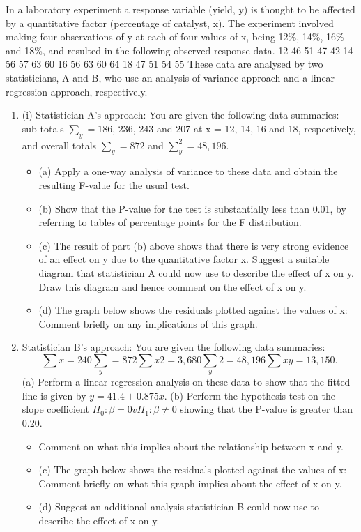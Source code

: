 \documentclass[a4paper,12pt]{article}
\begin{document}

In a laboratory experiment a response variable (yield, y) is thought to be affected by a quantitative factor (percentage of catalyst, x). The experiment involved making four
observations of y at each of four values of x, being 12\%, 14\%, 16\% and 18\%, and
resulted in the following observed response data.
12%
46
51
47
42
14%
56
57
63
60
16%
56
63
60
64
18%
47
51
54
55
These data are analysed by two statisticians, A and B, who use an analysis of variance
approach and a linear regression approach, respectively.
\begin{enumerate}
\item (i)
Statistician A’s approach:
You are given the following data summaries:
sub-totals $\sum_y = 186$, 236, 243 and 207 at x = 12, 14, 16 and 18,
respectively, and overall totals $\sum_y = 872$ and $\sum_y^2 = 48,196$.
\begin{itemize}
\item (a) Apply a one-way analysis of variance to these data and obtain the
resulting F-value for the usual test.
\item (b) Show that the P-value for the test is substantially less than 0.01, by referring to tables of percentage points for the F distribution.
\item (c) The result of part (b) above shows that there is very strong evidence of
an effect on y due to the quantitative factor x. Suggest a suitable
diagram that statistician A could now use to describe the effect of x on
y. Draw this diagram and hence comment on the effect of x on y.
\item (d) The graph below shows the residuals plotted against the values of x:
Comment briefly on any implications of this graph.
\end{itemize}

\item Statistician B’s approach:
You are given the following data summaries:
\[\sum x = 240 \sum_y = 872 \sum x 2 = 3,680 \sum_y 2 = 48,196 \sum xy = 13,150.\]
(a) Perform a linear regression analysis on these data to show that the
fitted line is given by $y = 41.4 + 0.875x$.
(b) Perform the hypothesis test on the slope coefficient
$H_0 : \beta = 0 v H_{1} : \beta \neq 0$
showing that the P-value is greater than 0.20.

\begin{itemize}
    \item Comment on what this implies about the relationship between x and y.

\item (c) The graph below shows the residuals plotted against the values of x:
Comment briefly on what this graph implies about the effect of x on y.
\item (d)
Suggest an additional analysis statistician B could now use to describe
the effect of x on y.
\end{itemize}
\end{enumerate}
\newpage
\end{document}
